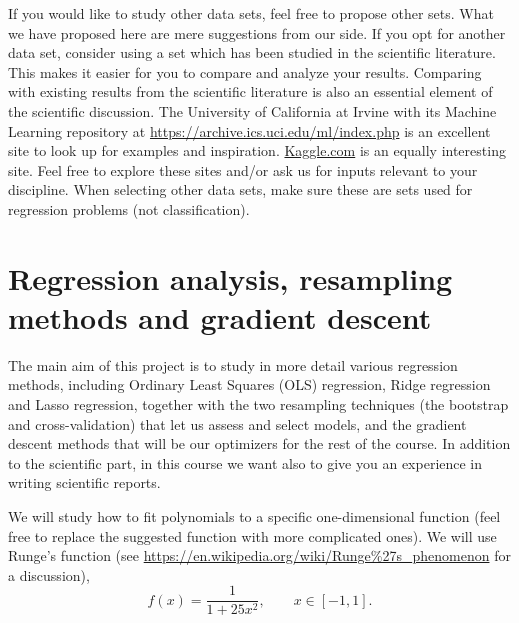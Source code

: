 \documentclass[11pt,a4paper]{article}
\begin{document}
If you would like to study other data sets, feel free to propose other sets.
What we have proposed here are mere suggestions from our side.  If you opt for
another data set, consider using a set which has been studied in the
scientific literature.  This makes it easier for you to compare and analyze
your results.  Comparing with existing results from the scientific literature
is also an essential element of the scientific discussion.  The University of
California at Irvine with its Machine Learning repository at
\url{https://archive.ics.uci.edu/ml/index.php} is an excellent site to look up
for examples and inspiration.  \href{https://www.kaggle.com/}{Kaggle.com} is
an equally interesting site.  Feel free to explore these sites and/or ask us for inputs relevant to your discipline.  When
selecting other data sets, make sure these are sets used for regression
problems (not classification).

\section*{Regression analysis, resampling methods and gradient descent}

The main aim of this project is to study in more detail various regression
methods, including Ordinary Least Squares (OLS) regression, Ridge regression
and Lasso regression, together with the two resampling techniques (the
bootstrap and cross-validation) that let us assess and select models, and the
gradient descent methods that will be our optimizers for the rest of the
course.  In addition to the scientific part, in this course we want also to
give you an experience in writing scientific reports.

We will study how to fit polynomials to a specific one-dimensional function
(feel free to replace the suggested function with more complicated ones).  We
will use Runge's function (see
\url{https://en.wikipedia.org/wiki/Runge%27s_phenomenon} for a discussion),
\[
  f(x) = \frac{1}{1+25x^2}, \qquad x\in[-1,1].
\]
\end{document}
